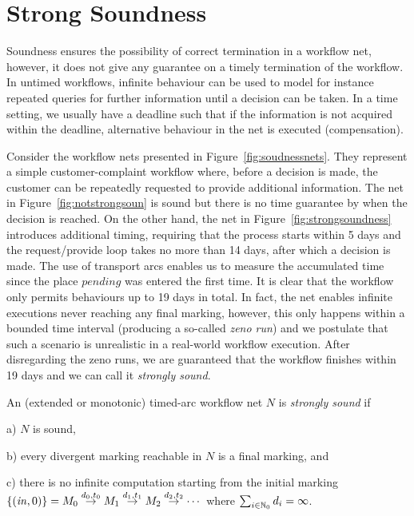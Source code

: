 \section{Strong Soundness} \label{sec:strong}
Soundness 
ensures the possibility of correct
termination in a workflow net, however, it does not
give any guarantee on a timely termination of the workflow.
In untimed workflows, infinite behaviour
can be used to model for instance repeated queries for further information
until a decision can be taken. In a time setting,
we usually have a deadline such that if the information
is not acquired within the deadline, alternative behaviour in the net
is executed (compensation).

Consider the workflow nets presented in Figure~\ref{fig:soudnessnets}.
They represent a simple customer-complaint workflow where,
before a decision is made, the customer can be repeatedly requested
to provide additional information.
The net in Figure~\ref{fig:notstrongsoun}
is sound but there is no time guarantee by when
the decision is reached. On the other hand,
the net in Figure~\ref{fig:strongsoundness}
introduces additional timing, 
requiring that the process starts within 5 days and the
request/provide loop takes no more than 14 days, after which a decision
is made. The use of
transport arcs enables us to measure the accumulated time since the
place $\mathit{pending}$ was entered the first time. It is clear that
the workflow only permits behaviours up to 19 days in total.
In fact, the net %
enables infinite executions never reaching any final marking,
however, this only happens within a bounded time interval 
(producing a so-called \emph{zeno run})
and we postulate that such a scenario is unrealistic in
a real-world workflow execution. After disregarding the zeno runs,
we are guaranteed that the workflow finishes within 19 days
and we can call it \emph{strongly sound}. 

\begin{definition} \label{def:strongsound}
An (extended or monotonic) timed-arc workflow net $N$ %
is \emph{strongly sound} if 
\begin{description}
\item{a)} $N$ is sound, 
\item{b)} every divergent marking reachable in $N$ is a final marking, and
\item{c)} there is no infinite computation starting from the initial marking \\
$\{({\mathit{in}},0)\}=M_0 \stackrel{d_0,t_0}{\rightarrow} M_1 
\stackrel{d_1,t_1}{\rightarrow} M_2 \stackrel{d_2,t_2}{\rightarrow} \cdots$ 
where $\sum_{i \in \mathbb{N}_{0}}d_i = \infty$.
\end{description}
\end{definition}

